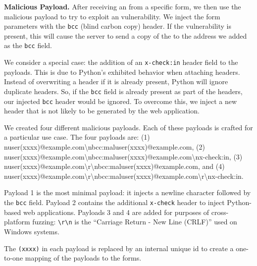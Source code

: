 \noindent\textbf{Malicious Payload.}
After receiving an \email from a specific form, we then use the malicious payload to try to exploit an \ehi vulnerability. We inject the form parameters with the \texttt{bcc} (blind carbon copy) header. If the vulnerability is present, this will cause the server to send a copy of the \email to the \email address we added as the \texttt{bcc} field.

We consider a special case: the addition of an \texttt{x-check:in} header field to the payloads. This is due to Python's exhibited behavior when attaching
headers. Instead of overwriting a header if it is already present, Python will ignore duplicate headers. So, if the \texttt{bcc} field is already present as part of the headers, our injected \texttt{bcc} header would be ignored. To overcome this, we inject a new header that is not likely to be generated by the web application. 

We created four different malicious payloads. Each of these payloads
is crafted for a particular use case. The four payloads are:
(1) nuser(xxxx)@example.com\textbackslash{}n\-bcc:\-maluser\-(xxxx)\-@example.com,
(2) nuser(xxxx)@\-example.com\textbackslash{}n\-bcc:\-maluser\-(xxxx)\-@example.com\textbackslash{}n\-x-check:in,
(3) nuser(xxxx)@\-example.com\textbackslash{}r\textbackslash{}n\-bcc:\-maluser(xxxx)\-@example.com,
and (4) nuser(xxxx)\-@example.com\textbackslash{}r\textbackslash{}n\-bcc:\-maluser(xxxx)\-@example.\-com\textbackslash{}r\textbackslash{}n\-x-check:in.
	
Payload 1 is the most minimal payload: it injects a newline character followed by the \texttt{bcc} field. Payload 2 contains the additional \texttt{x-check} header to inject Python-based web applications. Payloads 3 and 4 are added for purposes of cross-platform fuzzing: \texttt{\textbackslash{}r\textbackslash{}n} is the ``Carriage Return - New Line (CRLF)'' used on Windows systems.~\cite{rfc2616}

The \texttt{(xxxx)} in each payload is replaced by an internal unique id to create a one-to-one mapping of the payloads to the forms.


